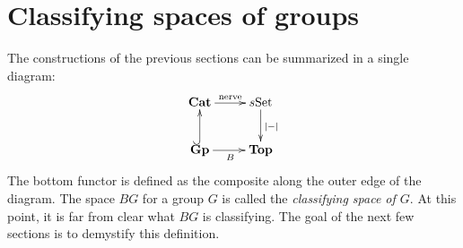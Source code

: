 \section{Classifying spaces of groups}
%
The constructions of the previous sections can be summarized in a single
diagram:
\begin{equation*}
    \xymatrix{
	\Cat\ar[r]^{\text{nerve}} & s\Set\ar[d]^{|-|}\\
	\mathbf{Gp}\ar@{^(->}[u]\ar[r]_{B} & \Top
    }
\end{equation*}
The bottom functor is defined as the composite along the outer edge of the
diagram. The space $BG$ for a group $G$ is called the \emph{classifying space
of $G$}. At this point, it is far from clear what $BG$ is classifying. The goal
of the next few sections is to demystify this definition.

